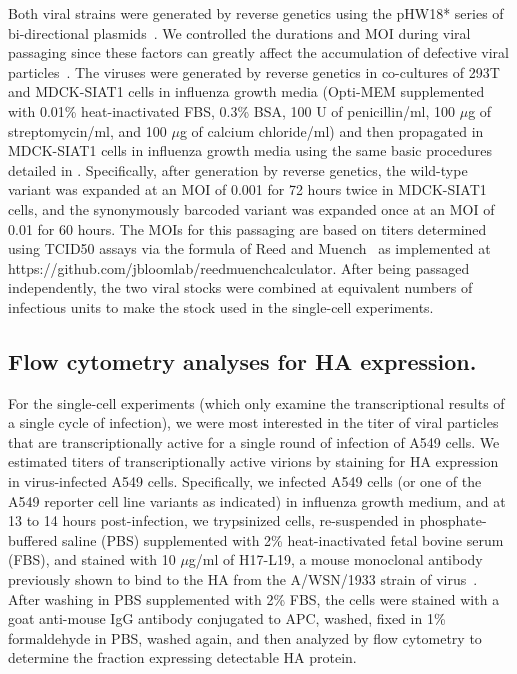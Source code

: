 \documentclass[]{article}
\begin{document}
Both viral strains were generated by reverse genetics using the pHW18* series of bi-directional plasmids~\cite{hoffmann2000dna}.
We controlled the durations and MOI during viral passaging since these factors can greatly affect the accumulation of defective viral particles~\cite{xue2016propagation}.
The viruses were generated by reverse genetics in co-cultures of 293T and MDCK-SIAT1 cells in influenza growth media (Opti-MEM supplemented with 0.01\% heat-inactivated FBS, 0.3\% BSA, 100 U of penicillin/ml, 100 $\mu$g of streptomycin/ml, and 100 $\mu$g of calcium chloride/ml) and then propagated in MDCK-SIAT1 cells in influenza growth media using the same basic procedures detailed in \cite{russell2018extreme}.
Specifically, after generation by reverse genetics, the wild-type variant was expanded at an MOI of 0.001 for 72 hours twice in MDCK-SIAT1 cells, and the synonymously barcoded variant was expanded once at an MOI of 0.01 for 60 hours.
The MOIs for this passaging are based on titers determined using TCID50 assays via the formula of Reed and Muench~\cite{reed1938simple} as implemented at https://github.com/jbloomlab/reedmuenchcalculator.
After being passaged independently, the two viral stocks were combined at equivalent numbers of infectious units to make the stock used in the single-cell experiments.

\subsection*{Flow cytometry analyses for HA expression.}
For the single-cell experiments (which only examine the transcriptional results of a single cycle of infection), we were most interested in the titer of viral particles that are transcriptionally active for a single round of infection of A549 cells.
We estimated titers of transcriptionally active virions by staining for HA expression in virus-infected A549 cells.
Specifically, we infected A549 cells (or one of the A549 reporter cell line variants as indicated) in influenza growth medium, and at 13 to 14 hours post-infection, we trypsinized cells, re-suspended in phosphate-buffered saline (PBS) supplemented with 2\% heat-inactivated fetal bovine serum (FBS), and stained with 10 $\mu$g/ml of H17-L19, a mouse monoclonal antibody previously shown to bind to the HA from the A/WSN/1933 strain of virus~\cite{doud2017complete}.
After washing in PBS supplemented with 2\% FBS, the cells were stained with a goat anti-mouse IgG antibody conjugated to APC, washed, fixed in 1\% formaldehyde in PBS, washed again, and then analyzed by flow cytometry to determine the fraction expressing detectable HA protein.
\end{document}
